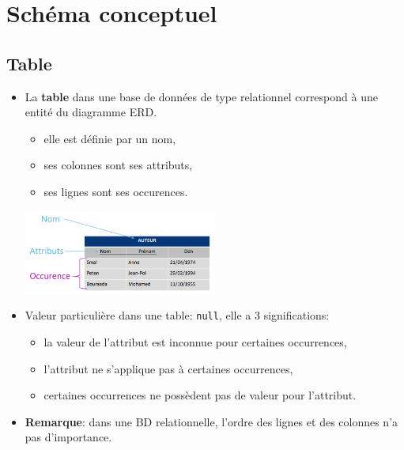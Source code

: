 \documentclass[a4paper]{article}
\begin{document}
\section{Schéma conceptuel}










\subsection{Table}





\begin{itemize}



\item La \textbf{table} dans une base de données de type relationnel correspond à une entité du diagramme ERD.
\begin{itemize}
    \item elle est définie par un nom,
    \item ses colonnes sont ses attributs,
    \item ses lignes sont ses occurences.
\end{itemize}
\begin{center}
    \includegraphics[width=0.5\textwidth]{../images/table01.PNG}
\end{center}



\item Valeur particulière dans une table: \texttt{null}, elle a 3 significations:
\begin{itemize}
    \item la valeur de l’attribut est inconnue pour certaines occurrences,
    \item l’attribut ne s’applique pas à certaines occurrences,
    \item certaines occurrences ne possèdent pas de valeur pour l’attribut.
\end{itemize}



\item \textbf{Remarque}: dans une BD relationnelle, l'ordre des lignes et des colonnes n'a pas d'importance.



\end{itemize}
\end{document}
